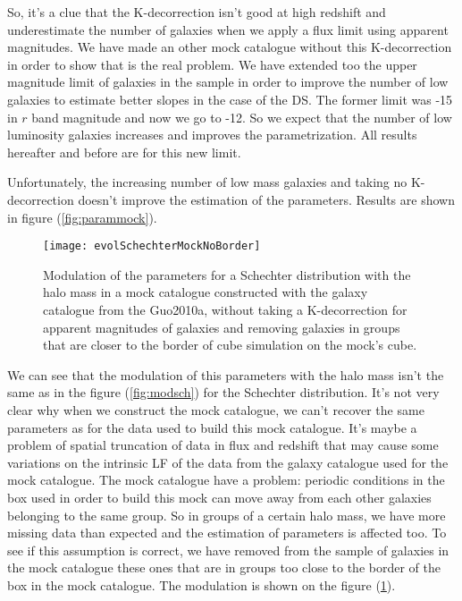 So, it's a clue that the K-decorrection isn't good at high redshift and
underestimate the number of galaxies when we apply a flux limit using apparent
magnitudes. We have made an other mock catalogue without this K-decorrection in
order to show that is the real problem. We have extended too the upper
magnitude limit of galaxies in the sample in order to improve the number of low
galaxies to estimate better slopes in the case of the DS\@. The former limit
was -15 in $r$ band magnitude and now we go to -12. So we expect that the
number of low luminosity galaxies increases and improves the parametrization.
All results hereafter and before are for this new limit.

Unfortunately, the increasing number of low mass galaxies and taking no
K-decorrection doesn't improve the estimation of the parameters. Results are
shown in figure (\ref{fig:parammock}).
%
\begin{figure}[htb]
    \centering
    \texttt{[image: evolSchechterMockNoBorder]}
    \caption{Modulation of the parameters for a Schechter distribution with the
        halo mass in a mock catalogue constructed with the galaxy catalogue
        from the Guo2010a, without taking a K-decorrection for apparent
        magnitudes of galaxies and removing galaxies in groups that are closer
    to the border of cube simulation on the mock's cube.}
\label{fig:parammocknoborder}
\end{figure}

We can see that the modulation of this parameters with the halo mass isn't the
same as in the figure (\ref{fig:modsch}) for the Schechter distribution. It's
not very clear why when we construct the mock catalogue, we can't recover the
same parameters as for the data used to build this mock catalogue. It's maybe a
problem of spatial truncation of data in flux and redshift that may cause some
variations on the intrinsic LF of the data from the galaxy catalogue used for
the mock catalogue. The mock catalogue have a problem: periodic conditions in
the box used in order to build this mock can move away from each other galaxies
belonging to the same group. So in groups of a certain halo mass, we have more
missing data than expected and the estimation of parameters is affected too. To
see if this assumption is correct, we have removed from the sample of galaxies
in the mock catalogue these ones that are in groups too close to the border of
the box in the mock catalogue. The modulation is shown on the figure
(\ref{fig:parammocknoborder}).

